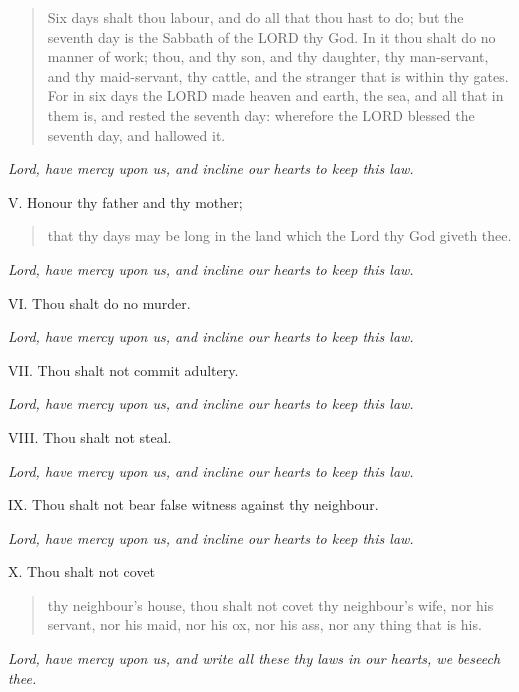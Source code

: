 \begin{quote}

Six
days shalt thou labour, and do all that thou hast to do; but the seventh
day is the Sabbath of the LORD thy God. In it
thou shalt do no manner of work; thou, and thy son, and thy daughter,
thy man-servant, and thy maid-servant, thy cattle, and the stranger
that is within thy gates. For in six days the LORD
made heaven and earth, the sea, and all that in them is, and rested
the seventh day: wherefore the LORD blessed the
seventh day, and hallowed it.

\end{quote}

\emph{Lord, have mercy upon us, and incline our hearts to keep this law.}

V.
Honour thy father and thy mother;

\begin{quote}

that
thy days may be long in the land which the Lord thy God giveth thee.

\end{quote}

\emph{Lord, have mercy upon us, and incline our hearts to keep this law.}

VI. Thou shalt do no murder.

\emph{Lord, have mercy upon us, and incline our hearts to keep this law.}

VII. Thou shalt not commit adultery.

\emph{Lord, have mercy upon us, and incline our hearts to keep this law.}

VIII. Thou shalt not steal.

\emph{Lord, have mercy upon us, and incline our hearts to keep this law.}

IX. Thou shalt not bear false witness against thy neighbour.

\emph{Lord, have mercy upon us, and incline our hearts to keep this law.}

X. Thou shalt not covet

\begin{quote}

thy
neighbour's house, thou shalt not covet thy neighbour's wife, nor his
servant, nor his maid, nor his ox, nor his ass, nor any thing that is
his.

\end{quote}

\emph{Lord, have mercy upon us, and write all these thy laws in our hearts,
we beseech thee.}

